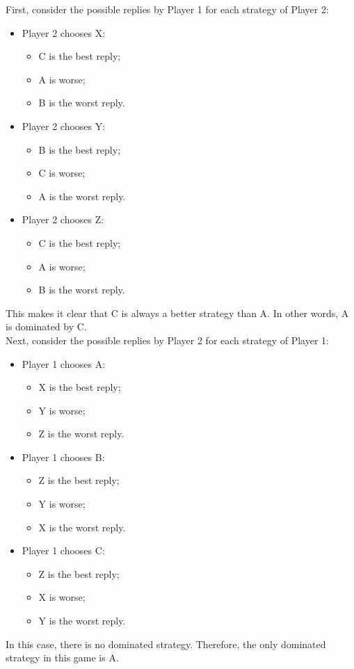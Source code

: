 \documentclass[11pt]{article}
\begin{document}
First, consider the possible replies by Player 1 for each strategy of Player 2:
\begin{itemize}
\item Player 2 chooses X:
\begin{itemize}
\item C is the best reply;
\item A is worse;
\item B is the worst reply.
\end{itemize}
\item Player 2 chooses Y:
\begin{itemize}
\item B is the best reply;
\item C is worse;
\item A is the worst reply.
\end{itemize}
\item Player 2 chooses Z:
\begin{itemize}
\item C is the best reply;
\item A is worse;
\item B is the worst reply.
\end{itemize}
\end{itemize}
This makes it clear that C is always a better strategy than A. In other words, A
is dominated by C.\\
Next, consider the possible replies by Player 2 for each strategy of Player 1:
\begin{itemize}
\item Player 1 chooses A:
\begin{itemize}
\item X is the best reply;
\item Y is worse;
\item Z is the worst reply.
\end{itemize}
\item Player 1 chooses B:
\begin{itemize}
\item Z is the best reply;
\item Y is worse;
\item X is the worst reply.
\end{itemize}
\item Player 1 chooses C:
\begin{itemize}
\item Z is the best reply;
\item X is worse;
\item Y is the worst reply.
\end{itemize}
\end{itemize}
In this case, there is no dominated strategy. Therefore, the only dominated
strategy in this game is A.
\end{document}
